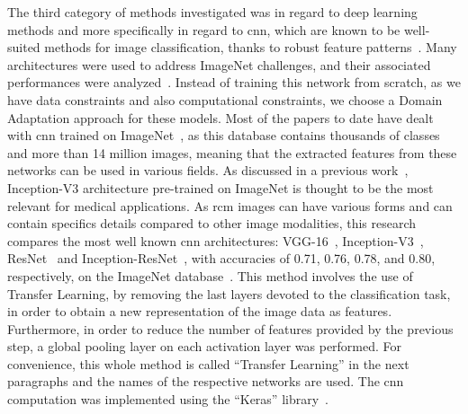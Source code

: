 \documentclass[journal,article,accept,moreauthors,pdftex, applsci]{Definitions/mdpi}
\begin{document}
The third category of methods investigated was in regard to deep learning methods and more specifically in regard to \ac{cnn}, which are known to be well-suited methods for image classification, thanks to robust feature patterns~\cite{Pathan2018}. Many architectures were used to address ImageNet challenges, and their associated performances were analyzed~\cite{Canziani2016}. Instead of training this network from scratch, as we have data constraints and also computational constraints, we choose a Domain Adaptation approach for these models. Most of the papers to date have dealt with \ac{cnn} trained on ImageNet~\cite{Deng2008}, as this database contains thousands of classes and more than 14 million images, meaning that the extracted features from these networks can be used in various fields. As discussed in a previous work~\cite{Litjens2017}, Inception-V3 architecture pre-trained on ImageNet is thought to be the most relevant for medical applications. As \ac{rcm} images can have various forms and can contain specifics details compared to other image modalities, this research compares the most well known \ac{cnn} architectures: VGG-16~\cite{Simonyan2014}, Inception-V3~\cite{Szegedy2015}, ResNet~\cite{He2016} and Inception-ResNet~\cite{Szegedy2017}, with accuracies of 0.71, 0.76, 0.78, and 0.80, respectively, on the ImageNet database~\cite{Canziani2016}. This method involves the use of Transfer Learning, by removing the last layers devoted to the classification task, in order to obtain a new representation of the image data as features. Furthermore, in order to reduce the number of features provided by the previous step, a global pooling layer on each activation layer was performed. For convenience, this whole method is called “Transfer Learning” in the next paragraphs and the names of the respective networks are used. The \ac{cnn} computation was implemented using the “Keras” library~\cite{chollet2015keras}.\par

\end{document}
